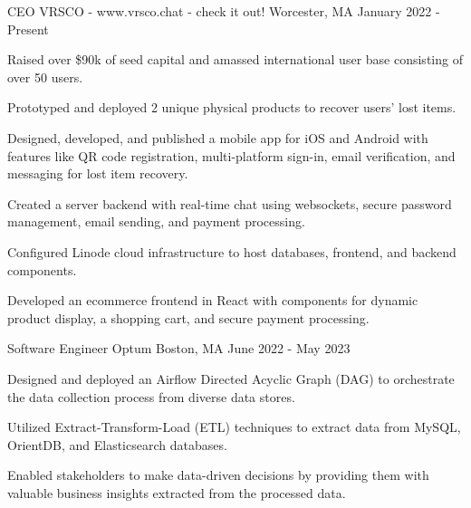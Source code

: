 

\begin{cventries}

  \cventry
    {CEO} %
    {VRSCO - www.vrsco.chat - check it out!} %
    {Worcester, MA} %
    {January 2022 - Present}
    {
      \begin{cvitems} %
      \item {Raised over \$90k of seed capital and amassed international user base consisting of over 50 users.}
      \item {Prototyped and deployed 2 unique physical products to recover users' lost items.}
      \item {Designed, developed, and published a mobile app for iOS and Android with features like QR code registration, multi-platform sign-in, email verification, and messaging for lost item recovery.}
      \item {Created a server backend with real-time chat using websockets, secure password management, email sending, and payment processing.}
      \item {Configured Linode cloud infrastructure to host databases, frontend, and backend components.}
      \item {Developed an ecommerce frontend in React with components for dynamic product display, a shopping cart, and secure payment processing.}
      \end{cvitems}
    }
  \cventry
    {Software Engineer} %
    {Optum} %
    {Boston, MA} %
    {June 2022 - May 2023} %
    {
      \begin{cvitems} %
        \item {Designed and deployed an Airflow Directed Acyclic Graph (DAG) to orchestrate the data collection process from diverse data stores.}
        \item {Utilized Extract-Transform-Load (ETL) techniques to extract data from MySQL, OrientDB, and Elasticsearch databases.}
        \item {Enabled stakeholders to make data-driven decisions by providing them with valuable business insights extracted from the processed data.}

\end{cvitems}}
\end{cventries}
